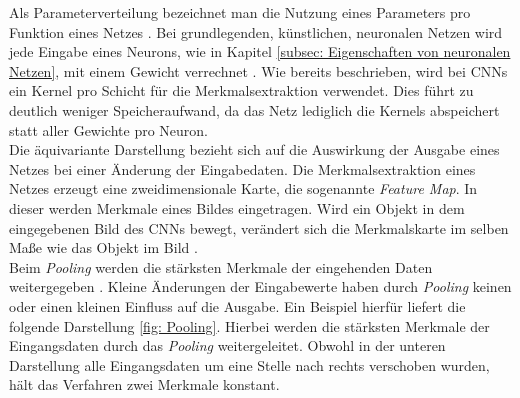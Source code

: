 		Als Parameterverteilung bezeichnet man die Nutzung eines Parameters pro Funktion eines Netzes \cite{deeplearning}. Bei grundlegenden, künstlichen, neuronalen Netzen wird jede Eingabe eines Neurons, wie in Kapitel \ref{subsec: Eigenschaften von neuronalen Netzen}, mit einem Gewicht verrechnet  \cite{deeplearning}. Wie bereits beschrieben, wird bei CNNs ein Kernel pro Schicht für die Merkmalsextraktion verwendet. Dies führt zu deutlich weniger Speicheraufwand, da das Netz lediglich die Kernels abspeichert statt aller Gewichte pro Neuron.\\
		
		Die äquivariante Darstellung bezieht sich auf die Auswirkung der Ausgabe eines Netzes bei einer Änderung der Eingabedaten. Die Merkmalsextraktion eines Netzes erzeugt eine zweidimensionale Karte, die sogenannte \textit{Feature Map}. In dieser werden Merkmale eines Bildes eingetragen. Wird ein Objekt in dem eingegebenen Bild des CNNs bewegt, verändert sich die Merkmalskarte im selben Maße wie das Objekt im Bild \cite{deeplearning}.\\		
		
		Beim \textit{Pooling} werden die stärksten Merkmale der eingehenden Daten weitergegeben \cite{deeplearning}. Kleine Änderungen der Eingabewerte haben durch \textit{Pooling} keinen oder einen kleinen Einfluss auf die Ausgabe. Ein Beispiel hierfür liefert die folgende Darstellung \ref{fig: Pooling}. Hierbei werden die stärksten Merkmale der Eingangsdaten durch das \textit{Pooling} weitergeleitet. Obwohl in der unteren Darstellung alle Eingangsdaten um eine Stelle nach rechts verschoben wurden, hält das Verfahren zwei Merkmale konstant.\\
		
